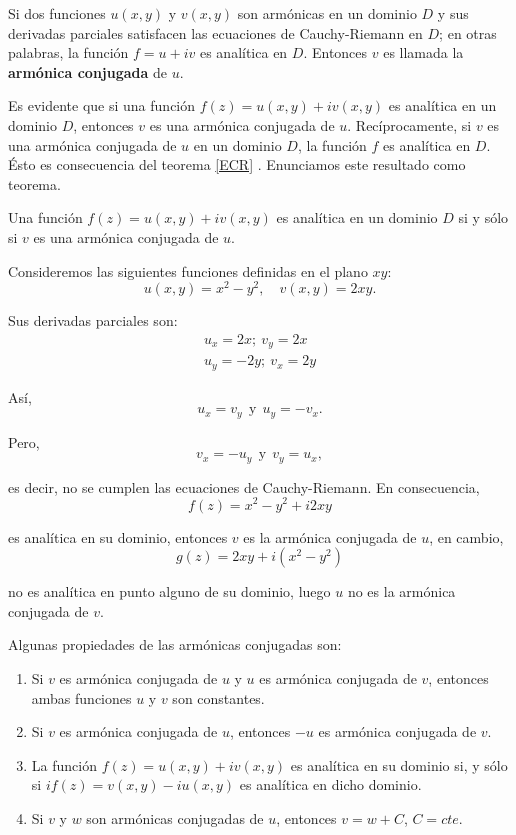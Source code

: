 \begin{defi}
Si dos funciones $u(x,y)$ y $v(x,y)$ son armónicas en un dominio $D$ y sus derivadas parciales satisfacen las ecuaciones de Cauchy-Riemann en $D$; en otras palabras, la función $f = u + iv$ es analítica en $D$. Entonces  $v$ es llamada la \textbf{armónica conjugada} de $u$. 
\end{defi}

Es evidente que si una función $f(z) = u(x,y) + iv(x,y)$ es analítica en un dominio $D$, entonces $v$ es una armónica conjugada de $u$. Recíprocamente, si $v$ es una armónica conjugada de $u$ en un dominio $D$, la función $f$ es analítica en $D$. Ésto es consecuencia del teorema \ref{ECR} . Enunciamos este resultado como teorema.

\begin{teorema}
Una función $f(z) = u(x,y) + iv(x,y)$ es analítica en un dominio $D$ si y sólo si $v$ es una armónica conjugada de $u$.
\end{teorema}

\begin{ejemplo}
Consideremos las siguientes funciones definidas en el plano $xy$:
$$u(x,y) = x^2-y^2, \quad v(x,y) = 2xy.$$

Sus derivadas parciales son:
\begin{eqnarray*}
u_x = 2x; ~ v_y = 2x\\
u_y = -2y; ~ v_x = 2y
\end{eqnarray*}

Así, 
$$u_x = v_y ~~\mbox{y}~~ u_y = -v_x.$$

Pero,
$$v_x = - u_y ~~\mbox{y}~~ v_y = u_x,$$

es decir, no se cumplen las ecuaciones de Cauchy-Riemann. En consecuencia,
$$f(z) = x^2-y^2 + i2xy$$

es analítica en su dominio, entonces $v$ es la armónica conjugada de $u$, en cambio,
$$g(z) = 2xy + i(x^2-y^2)$$

no es analítica en punto alguno de su dominio, luego $u$ no es la armónica conjugada de $v$.
\end{ejemplo}

\begin{propo}

Algunas propiedades de las armónicas conjugadas son:

\begin{enumerate}
\item Si $v$ es armónica conjugada de $u$ y $u$ es armónica conjugada de $v$, entonces ambas funciones $u$ y $v$ son constantes.

\item Si $v$ es armónica conjugada de $u$, entonces $-u$ es armónica conjugada de $v$.

\item La función $f(z) = u(x,y) + iv(x,y)$  es analítica en su dominio si, y sólo si $if(z) = v(x,y) - iu(x,y)$ es analítica en dicho dominio.

\item Si $v$ y $w$ son armónicas conjugadas de $u$, entonces $v = w + C$, $C = cte$.
\end{enumerate}
\end{propo}


